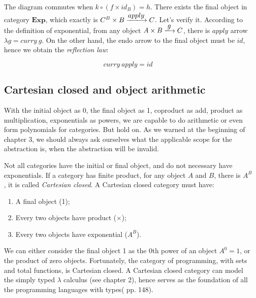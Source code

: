 \documentclass{article}
\begin{document}
The diagram commutes when $k \circ (f \times id_B) = h$. There exists the final object in category $\pmb{Exp}$, which exactly is $C^B \times B \arrowto{apply} C$. Let's verify it. According to the definition of exponential, from any object $A \times B \arrowto{g} C$, there is $apply$ arrow $\lambda g = curry\ g$. On the other hand, the endo arrow to the final object must be $id$, hence we obtain the {\em reflection law}:

\[
curry\ apply = id
\]

\begin{Exercise}
\end{Exercise}

\subsection{Cartesian closed and object arithmetic}

With the initial object as 0, the final object as 1, coproduct as add, product as multiplication, exponentials as powers, we are capable to do arithmetic or even form polynomials for categories. But hold on. As we warned at the beginning of chapter 3, we should always ask ourselves what the applicable scope for the abstraction is, when the abstraction will be invalid.

Not all categories have the initial or final object, and do not necessary have exponentials. If a category has finite product, for any object $A$ and $B$, there is $A^B$, it is called {\em Cartesian closed}. A Cartesian closed category must have:

\begin{enumerate}
\item A final object (1);
\item Every two objects have product ($\times$);
\item Every two objects have exponential ($A^B$).
\end{enumerate}

We can either consider the final object 1 as the 0th power of an object $A^0 = 1$, or the product of zero objects. Fortunately, the category of programming, with sets and total functions, is Cartesian closed. A Cartesian closed category can model the simply typed $\lambda$ calculus (see chapter 2), hence serves as the foundation of all the programming languages with types(\cite{Milewski2018} pp. 148).
\end{document}
